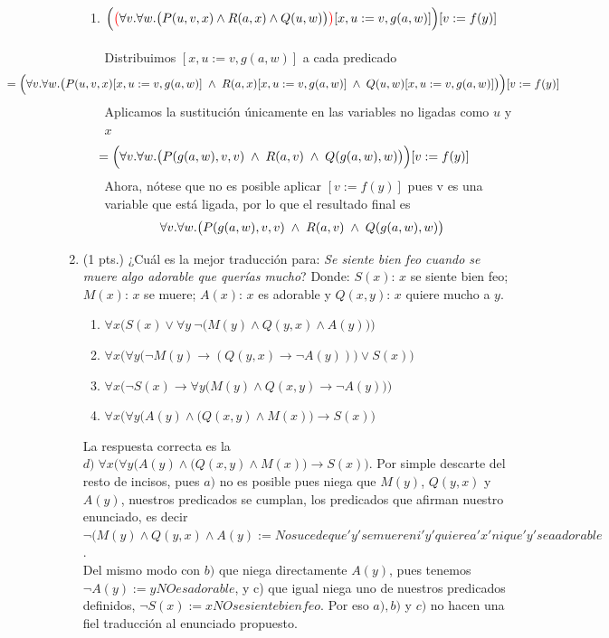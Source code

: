 \documentclass[12pt,letterpaper]{article}
\newcommand{\imp}{\rightarrow}
\begin{document}
\begin{enumerate}
\begin{enumerate}[label=\alph*)]
  \item $\Big(\begingroup\colorlet{savedleftcolor}{.}\color{red}\big(\color{savedleftcolor}\forall v .\forall w . \big( P (u, v, x) \wedge R(a, x) \wedge Q(u, w) \big)\color{red}\big)\endgroup [x, u := v, g(a, w)]\Big)[v:=f(y)]$\\
    \\
    Distribuimos $[x, u := v, g(a, w)]$ a cada predicado
    \[
    \hspace{-3cm}
    = \Big(\forall v .\forall w . \big( P (u, v, x) [x, u := v, g(a, w)]\;
    \wedge \; R(a, x) [x, u := v, g(a, w)]\;
    \wedge \; Q(u, w) [x, u := v, g(a, w)] \big)\Big)[v:=f(y)]
    \]
    Aplicamos la sustituci\'{o}n \'{u}nicamente en las variables no ligadas como $u$ y $x$
    \[
    \hspace{-1.5cm}
    = \Big(\forall v .\forall w .
    \big( P (g(a, w), v, v)\;
    \wedge \; R(a, v)\;
    \wedge \; Q(g(a, w), w) \big)\Big)[v:=f(y)]
    \]
    Ahora, n\'{o}tese que no es posible aplicar $[v:= f(y)]$ pues v es una variable que est\'{a} ligada, por lo que el resultado final es
    \[
    \hspace{-0.5cm}
    \forall v .\forall w . \big( P (g(a, w), v, v)\; \wedge \; R(a, v)\; \wedge \; Q(g(a, w), w) \big)
    \]
  \end{enumerate}

  \bigskip
  
  \item (1 pts.) ¿Cuál es la mejor traducción para: {\em Se siente bien feo cuando se muere algo adorable que querías mucho}? Donde: $S(x)$: $x$ se siente bien feo;  $M(x)$: $x$ se muere; $A(x)$: $x$ es adorable y $Q(x,y)$: $x$ quiere mucho a $y$.
	\begin{enumerate}[label=\alph*)]
	\item $\forall x\Big(S(x)\vee \forall y\ \neg\big(M(y)\wedge Q(y,x)\wedge A(y)\big)\Big)$
	\item $\forall x\Big(\forall y \big(\neg M(y)\imp (Q(y,x)\imp \neg A(y))\big)\vee S(x)\Big)$
	\item $\forall x\Big(\neg S(x) \imp \forall y \big(M(y)\wedge Q(x,y)\imp\neg A(y)\big)\Big)$
	\item $\forall x\Big(\forall y\big(A(y)\wedge( Q(x,y) \wedge M(x)\big)\imp S(x)\Big)$
	\end{enumerate}

        \bigskip
        La respuesta correcta es la $d)\; \forall x\Big(\forall y\big(A(y)\wedge( Q(x,y) \wedge M(x)\big)\imp S(x)\Big)$. Por simple descarte del resto de incisos, pues $a)$ no es posible pues niega que $M(y)$, $Q(y, x)$ y $A(y)$, nuestros predicados se cumplan, los predicados que afirman nuestro enunciado, es decir $\neg (M(y) \land Q(y, x) \land A(y) := No sucede que 'y' se muere ni 'y' quiere a 'x' ni que 'y' sea adorable$.\\
        Del mismo modo con $b)$ que niega directamente $A(y)$, pues tenemos $\neg A(y) := y NO es adorable$, y c) que igual niega uno de nuestros predicados definidos, $\neg S(x) := x NO se siente bien feo$.
        Por eso $a), b)$ y $c)$ no hacen una fiel traducci\'{o}n al enunciado propuesto.
    

\end{enumerate}
\end{document}
